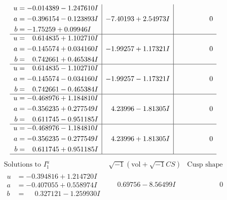 \documentclass[1p]{elsarticle_modified}
\theoremstyle{definition}
\newcommand{\I}{\sqrt{-1}}
\begin{document}
$$\begin{array}{c|c|c}
\begin{aligned}
u &= -0.014389 - 1.247610 I \\
a &= -0.396154 - 0.123893 I \\
b &= -1.75259 + 0.09946 I\end{aligned}
 & -7.40193 + 2.54973 I & \phantom{-0.000000 } 0 \\ \hline\begin{aligned}
u &= \phantom{-}0.614835 + 1.102710 I \\
a &= -0.145574 + 0.034160 I \\
b &= \phantom{-}0.742661 + 0.465384 I\end{aligned}
 & -1.99257 + 1.17321 I & \phantom{-0.000000 } 0 \\ \hline\begin{aligned}
u &= \phantom{-}0.614835 - 1.102710 I \\
a &= -0.145574 - 0.034160 I \\
b &= \phantom{-}0.742661 - 0.465384 I\end{aligned}
 & -1.99257 - 1.17321 I & \phantom{-0.000000 } 0 \\ \hline\begin{aligned}
u &= -0.468976 + 1.184810 I \\
a &= -0.356235 + 0.277549 I \\
b &= \phantom{-}0.611745 - 0.951185 I\end{aligned}
 & \phantom{-}4.23996 - 1.81305 I & \phantom{-0.000000 } 0 \\ \hline\begin{aligned}
u &= -0.468976 - 1.184810 I \\
a &= -0.356235 - 0.277549 I \\
b &= \phantom{-}0.611745 + 0.951185 I\end{aligned}
 & \phantom{-}4.23996 + 1.81305 I & \phantom{-0.000000 } 0\\
 \hline 
 \end{array}$$\newpage$$\begin{array}{c|c|c}  
\text{Solutions to }I^u_{1}& \I (\text{vol} + \sqrt{-1}CS) & \text{Cusp shape}\\
 \hline 
\begin{aligned}
u &= -0.394816 + 1.214720 I \\
a &= -0.407055 + 0.558974 I \\
b &= \phantom{-}0.327121 - 1.259930 I\end{aligned}
 & \phantom{-}0.69756 - 8.56499 I & \phantom{-0.000000 } 0 \\ \hline\begin{aligned}

\end{aligned}
\end{array}$$
\end{document}

